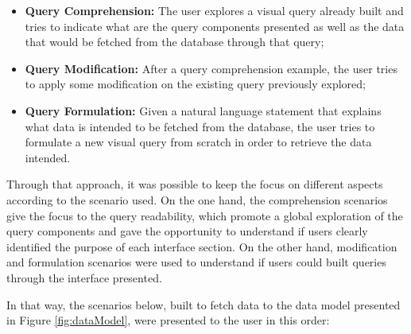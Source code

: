 \begin{itemize}
    \item \textbf{Query Comprehension: } The user explores a visual query already built and tries to indicate what are the query components presented as well as the data that would be fetched from the database through that query;
    \item \textbf{Query Modification: } After a query comprehension example, the user tries to apply some modification on the existing query previously explored;
    \item \textbf{Query Formulation: } Given a natural language statement that explains what data is intended to be fetched from the database, the user tries to formulate a new visual query from scratch in order to retrieve the data intended.
\end{itemize}

Through that approach, it was possible to keep the focus on different aspects according to the scenario used. On the one hand, the comprehension scenarios give the focus to the query readability, which promote a global exploration of the query components and gave the opportunity to understand if users clearly identified the purpose of each interface section. On the other hand, modification and formulation scenarios were used to understand if users could built queries through the interface presented.

In that way, the scenarios below, built to fetch data to the data model presented in Figure \ref{fig:dataModel}, were presented to the user in this order:  

